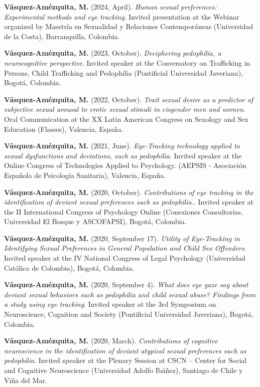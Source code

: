 \documentclass[11pt,a4paper,]{awesome-cv}
\begin{document}
\textbf{Vásquez-Amézquita, M.} (2024, April). \emph{Human sexual
preferences: Experimental methods and eye tracking}. Invited
presentation at the Webinar organized by Maestría en Sexualidad y
Relaciones Contemporáneas (Universidad de la Costa), Barranquilla,
Colombia.

\textbf{Vásquez-Amézquita, M.} (2023, October). \emph{Deciphering
pedophilia, a neurocognitive perspective}. Invited speaker at the
Conversatory on Trafficking in Persons, Child Trafficking and Pedophilia
(Pontificial Universidad Javeriana), Bogotá, Colombia.

\textbf{Vásquez-Amézquita, M.} (2022, October). \emph{Trait sexual
desire as a predictor of subjective sexual arousal to erotic sexual
stimuli in cisgender men and women}. Oral Communication at the XX Latin
American Congress on Sexology and Sex Education (Flasses), Valencia,
España.

\textbf{Vásquez-Amézquita, M.} (2021, June). \emph{Eye-Tracking
technology applied to sexual dysfunctions and deviations, such as
pedophilia}. Invited speaker at the Online Congress of Technologies
Applied to Psychology. (AEPSIS - Asociación Española de Psicología
Sanitaria), Valencia, España.

\textbf{Vásquez-Amézquita, M.} (2020, October). \emph{Contributions of
eye tracking in the identification of deviant sexual preferences such as
pedophilia.}. Invited speaker at the II International Congress of
Psychology Online (Conexiones Consultorías, Universidad El Bosque y
ASCOFAPSI), Bogotá, Colombia.

\textbf{Vásquez-Amézquita, M.} (2020, September 17). \emph{Utility of
Eye-Tracking in Identifying Sexual Preferences in General Population and
Child Sex Offenders}. Invited speaker at the IV National Congress of
Legal Psychology (Universidad Católica de Colombia), Bogotá, Colombia.

\textbf{Vásquez-Amézquita, M.} (2020, September 4). \emph{What does eye
gaze say about deviant sexual behaviors such as pedophilia and child
sexual abuse? Findings from a study using eye tracking}. Invited speaker
at the 3rd Symposium on Neuroscience, Cognition and Society (Pontificial
Universidad Javeriana), Bogotá, Colombia.

\textbf{Vásquez-Amézquita, M.} (2020, March). \emph{Contributions of
cognitive neuroscience in the identification of deviant atypical sexual
preferences such as pedophilia}. Invited speaker at the Plenary Session
at CSCN -- Center for Social and Cognitive Neuroscience (Universidad
Adolfo Ibáñez), Santiago de Chile y Viña del Mar.
\end{document}

